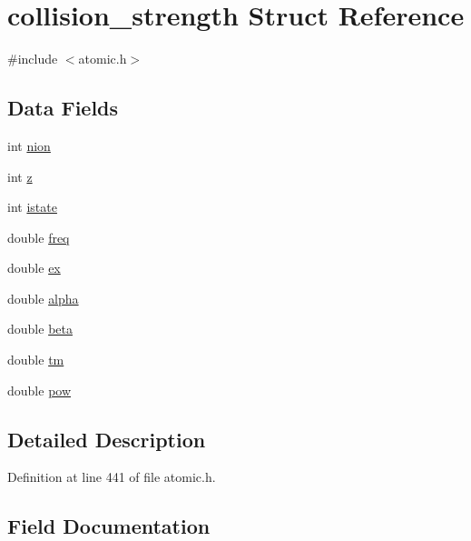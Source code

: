 \hypertarget{structcollision__strength}{}\section{collision\+\_\+strength Struct Reference}
\label{structcollision__strength}


{\ttfamily \#include $<$atomic.\+h$>$}

\subsection*{Data Fields}
\begin{DoxyCompactItemize}
\item 
int \hyperlink{structcollision__strength_a276f39780fe1b59cfabdad1478f97d15}{nion}
\item 
int \hyperlink{structcollision__strength_a9e774ea07c59180517b50bd71d6f3ae5}{z}
\item 
int \hyperlink{structcollision__strength_a9564f356ad5a4e8a2e0fee30b86b41c5}{istate}
\item 
double \hyperlink{structcollision__strength_a11b6d031e6f9a28c27111b88289c976e}{freq}
\item 
double \hyperlink{structcollision__strength_a6565832a5f3bcc11813bc00b4d56cb92}{ex}
\item 
double \hyperlink{structcollision__strength_ae90c9d536103a9c1ff274e3a8a0a28e7}{alpha}
\item 
double \hyperlink{structcollision__strength_abbf3c9454ff673d7cfd0435f538bb8d4}{beta}
\item 
double \hyperlink{structcollision__strength_a633b1f376dca9e2257be4f5d08eeb120}{tm}
\item 
double \hyperlink{structcollision__strength_a1afcaf258e446239881522da13b0903f}{pow}
\end{DoxyCompactItemize}


\subsection{Detailed Description}


Definition at line 441 of file atomic.\+h.



\subsection{Field Documentation}
\mbox{\label{structcollision__strength_ae90c9d536103a9c1ff274e3a8a0a28e7}} 

